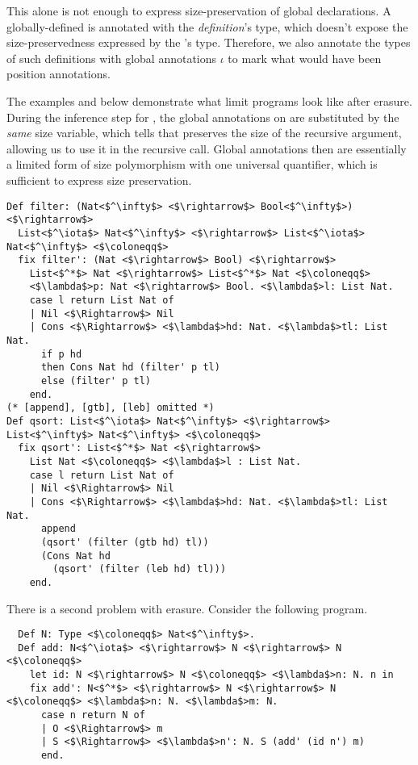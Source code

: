 This alone is not enough to express size-preservation of global declarations.
A globally-defined \cofixpoint is annotated with the \emph{definition}'s type, which doesn't expose the size-preservedness expressed by the \emph{\cofixpoint}'s type.
Therefore, we also annotate the types of such definitions with global annotations $\iota$ to mark what would have been position annotations.

The examples  and  below demonstrate what limit \lang programs look like after erasure.
During the inference step for , the global annotations on  are substituted by the \textit{same} size variable, which tells  that  preserves the size of the recursive argument, allowing us to use it in the recursive call.
Global annotations then are essentially a limited form of size polymorphism with one universal quantifier, which is sufficient to express size preservation.

\begin{multicols}{2}
\begin{verbatim}
Def filter: (Nat<$^\infty$> <$\rightarrow$> Bool<$^\infty$>) <$\rightarrow$>
  List<$^\iota$> Nat<$^\infty$> <$\rightarrow$> List<$^\iota$> Nat<$^\infty$> <$\coloneqq$>
  fix filter': (Nat <$\rightarrow$> Bool) <$\rightarrow$>
    List<$^*$> Nat <$\rightarrow$> List<$^*$> Nat <$\coloneqq$>
    <$\lambda$>p: Nat <$\rightarrow$> Bool. <$\lambda$>l: List Nat.
    case l return List Nat of
    | Nil <$\Rightarrow$> Nil
    | Cons <$\Rightarrow$> <$\lambda$>hd: Nat. <$\lambda$>tl: List Nat.
      if p hd
      then Cons Nat hd (filter' p tl)
      else (filter' p tl)
    end.
(* [append], [gtb], [leb] omitted *)
Def qsort: List<$^\iota$> Nat<$^\infty$> <$\rightarrow$> List<$^\infty$> Nat<$^\infty$> <$\coloneqq$>
  fix qsort': List<$^*$> Nat <$\rightarrow$>
    List Nat <$\coloneqq$> <$\lambda$>l : List Nat.
    case l return List Nat of
    | Nil <$\Rightarrow$> Nil
    | Cons <$\Rightarrow$> <$\lambda$>hd: Nat. <$\lambda$>tl: List Nat.
      append
      (qsort' (filter (gtb hd) tl))
      (Cons Nat hd
        (qsort' (filter (leb hd) tl)))
    end.
\end{verbatim}
\end{multicols}

There is a second problem with erasure.
Consider the following \lang program.

\begin{verbatim}
  Def N: Type <$\coloneqq$> Nat<$^\infty$>.
  Def add: N<$^\iota$> <$\rightarrow$> N <$\rightarrow$> N <$\coloneqq$>
    let id: N <$\rightarrow$> N <$\coloneqq$> <$\lambda$>n: N. n in
    fix add': N<$^*$> <$\rightarrow$> N <$\rightarrow$> N <$\coloneqq$> <$\lambda$>n: N. <$\lambda$>m: N.
      case n return N of
      | O <$\Rightarrow$> m
      | S <$\Rightarrow$> <$\lambda$>n': N. S (add' (id n') m)
      end.
\end{verbatim}


